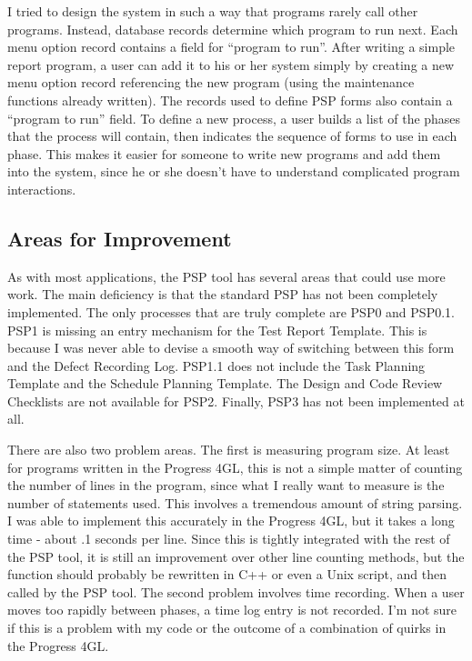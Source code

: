 I tried to design the system in such a way that programs rarely call other
programs.  Instead, database records determine which program to run next.
Each menu option record contains a field for ``program to run''.  After
writing a simple report program, a user can add it to his or her system
simply by creating a new menu option record referencing the new program
(using the maintenance functions already written).  The records used to
define PSP forms also contain a ``program to run'' field.  To define a new
process, a user builds a list of the phases that the process will contain,
then indicates the sequence of forms to use in each phase. This makes it
easier for someone to write new programs and add them into the system,
since he or she doesn't have to understand complicated program
interactions.

\subsection{\label{section:ImprovementIdeas}Areas for Improvement}

As with most applications, the PSP tool has several areas that could use
more work.  The main deficiency is that the standard PSP has not been
completely implemented.  The only processes that are truly complete are
PSP0 and PSP0.1.  PSP1 is missing an entry mechanism for the Test Report
Template.  This is because I was never able to devise a smooth way of
switching between this form and the Defect Recording Log.  PSP1.1 does not
include the Task Planning Template and the Schedule Planning Template.
The Design and Code Review Checklists are not available for PSP2.
Finally, PSP3 has not been implemented at all.

There are also two problem areas.  The first is measuring program size.  At
least for programs written in the Progress 4GL, this is not a simple matter
of counting the number of lines in the program, since what I really want to
measure is the number of statements used.  This involves a tremendous
amount of string parsing.  I was able to implement this accurately in the
Progress 4GL, but it takes a long time - about .1 seconds per line.  Since
this is tightly integrated with the rest of the PSP tool, it is still an
improvement over other line counting methods, but the function should
probably be rewritten in C++ or even a Unix script, and then called by the
PSP tool.  The second problem involves time recording.  When a user moves
too rapidly between phases, a time log entry is not recorded.  I'm not sure
if this is a problem with my code or the outcome of a combination of quirks
in the Progress 4GL.


